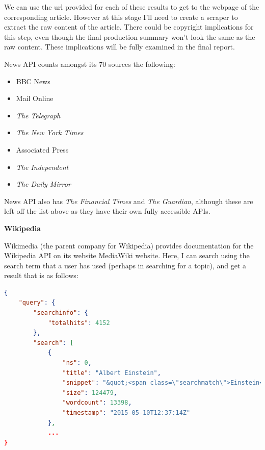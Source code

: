 \documentclass[12pt]{article}
\begin{document}
We can use the url provided for each of these results to get to the webpage of the corresponding article. However at this stage I'll need to create a scraper to extract the raw content of the article. There could be copyright implications for this step, even though the final production summary won't look the same as the raw content. These implications will be fully examined in the final report.

News API counts amongst its 70 sources the following: \\

\begin{itemize}
	\item BBC News 
	\item Mail Online 
	\item \emph{The Telegraph} 
	\item \emph{The New York Times} 
	\item Associated Press 
	\item \emph{The Independent} 
	\item \emph{The Daily Mirror}  \\
\end{itemize}

News API also has \emph{The Financial Times} and \emph{The Guardian}, although these are left off the list above as they have their own fully accessible APIs.  

\textbf{Wikipedia}

Wikimedia (the parent company for Wikipedia\cite{wikipedia}) provides documentation for the Wikipedia API on its website MediaWiki website. Here, I can search using the search term that a user has used (perhaps in searching for a topic), and get a result that is as follows:

\begin{lstlisting}[language=json, firstnumber=1, caption={A sample response to an API call to Wikipedia's API}]
{
    "query": {
        "searchinfo": {
            "totalhits": 4152
        },
        "search": [
            {
                "ns": 0,
                "title": "Albert Einstein",
                "snippet": "&quot;<span class=\"searchmatch\">Einstein</span>&quot; redirects here. For other uses, see <span class=\"searchmatch\">Albert</span> <span class=\"searchmatch\">Einstein</span> (disambiguation) and <span class=\"searchmatch\">Einstein</span> (disambiguation). <span class=\"searchmatch\">Albert</span> <span class=\"searchmatch\">Einstein</span> (/?alb?rt ?a?n?ta?n/; German:",
                "size": 124479,
                "wordcount": 13398,
                "timestamp": "2015-05-10T12:37:14Z"
            },
            ...
}
\end{lstlisting}
\end{document}
